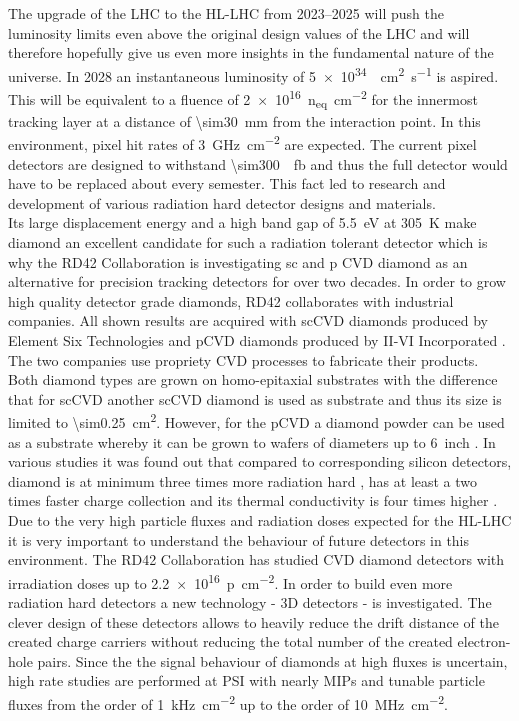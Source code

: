 The upgrade of the \ac{LHC} to the \ac{HL-LHC} from \SIrange{2023}{2025}{} \cite{hllhc} will push the luminosity limits even above the original design values of the \ac{LHC} and will therefore hopefully give us even more insights in the fundamental nature of the universe. In 2028 an instantaneous luminosity of \SI{5e34}{\per\centi\meter\squared\per\second} is aspired. This will be equivalent to a fluence of \SI{2e16}{n_{eq}\per \centi\meter^2} \cite{auzinger} for the innermost tracking layer at a distance of \SI{\sim30}{\milli\meter} from the interaction point. In this environment, pixel hit rates of \SI{3}{\giga\hertz\per\centi\meter^2} are expected. The current pixel detectors are designed to withstand \SI{\sim300}{\per\femto\barn} and thus the full detector would have to be replaced about every semester. This fact led to research and development of various radiation hard detector designs and materials.\\
Its large displacement energy and a high band gap of \SI{5.5}{\electronvolt} at \SI{305}{\kelvin} make diamond an excellent candidate for such a radiation tolerant detector which is why the RD42 Collaboration is investigating \ac{sc} and \ac{p} \ac{CVD} diamond as an alternative for precision tracking detectors for over two decades. In order to grow high quality detector grade diamonds, RD42 collaborates with industrial companies. All shown results are acquired with \ac{sc}\ac{CVD} diamonds produced by Element Six Technologies \cite{e6} and \ac{p}\ac{CVD} diamonds produced by II-VI Incorporated \cite{II6}. The two companies use propriety \ac{CVD} processes to fabricate their products. Both diamond types are grown on homo-epitaxial substrates with the difference that for \ac{sc}\ac{CVD} another \ac{sc}\ac{CVD} diamond is used as substrate and thus its size is limited to \SI{\sim0.25}{\centi\meter\squared}. However, for the \ac{p}\ac{CVD} a diamond powder can be used as a substrate whereby it can be grown to wafers of diameters up to \SI{6}{inch} \cite{felix}. In various studies it was found out that compared to corresponding silicon detectors, diamond is at minimum three times more radiation hard \cite{deboer}, has at least a two times faster charge collection \cite{pernegger} and its thermal conductivity is four times higher \cite{zhao}.\\
Due to the very high particle fluxes and radiation doses expected for the \ac{HL-LHC} it is very important to understand the behaviour of future detectors in this environment. The RD42 Collaboration has studied \ac{CVD} diamond detectors with irradiation doses up to \SI{2.2e16}{p\per\centi\meter^2}. In order to build even more radiation hard detectors a new technology - 3D detectors \cite{3D} - is investigated. The clever design of these detectors allows to heavily reduce the drift distance of the created charge carriers without reducing the total number of the created electron-hole pairs. Since the the signal behaviour of diamonds at high fluxes is uncertain, high rate studies are performed at \ac{PSI} with nearly \acp{MIP} and tunable particle fluxes from the order of \SI{1}{\kilo\hertz\per cm^2} up to the order of \SI{10}{\mega\hertz\per cm^2}.